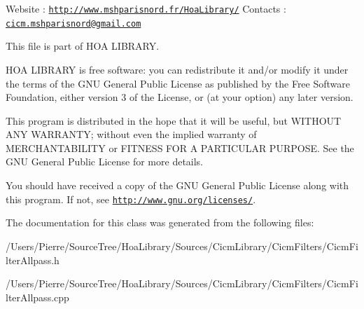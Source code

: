 Website \-: \href{http://www.mshparisnord.fr/HoaLibrary/}{\tt http\-://www.\-mshparisnord.\-fr/\-Hoa\-Library/} Contacts \-: \href{mailto:cicm.mshparisnord@gmail.com}{\tt cicm.\-mshparisnord@gmail.\-com}

This file is part of H\-O\-A L\-I\-B\-R\-A\-R\-Y.

H\-O\-A L\-I\-B\-R\-A\-R\-Y is free software\-: you can redistribute it and/or modify it under the terms of the G\-N\-U General Public License as published by the Free Software Foundation, either version 3 of the License, or (at your option) any later version.

This program is distributed in the hope that it will be useful, but W\-I\-T\-H\-O\-U\-T A\-N\-Y W\-A\-R\-R\-A\-N\-T\-Y; without even the implied warranty of M\-E\-R\-C\-H\-A\-N\-T\-A\-B\-I\-L\-I\-T\-Y or F\-I\-T\-N\-E\-S\-S F\-O\-R A P\-A\-R\-T\-I\-C\-U\-L\-A\-R P\-U\-R\-P\-O\-S\-E. See the G\-N\-U General Public License for more details.

You should have received a copy of the G\-N\-U General Public License along with this program. If not, see \href{http://www.gnu.org/licenses/}{\tt http\-://www.\-gnu.\-org/licenses/}. 

The documentation for this class was generated from the following files\-:\begin{DoxyCompactItemize}
\item 
/\-Users/\-Pierre/\-Source\-Tree/\-Hoa\-Library/\-Sources/\-Cicm\-Library/\-Cicm\-Filters/Cicm\-Filter\-Allpass.\-h\item 
/\-Users/\-Pierre/\-Source\-Tree/\-Hoa\-Library/\-Sources/\-Cicm\-Library/\-Cicm\-Filters/Cicm\-Filter\-Allpass.\-cpp\end{DoxyCompactItemize}
